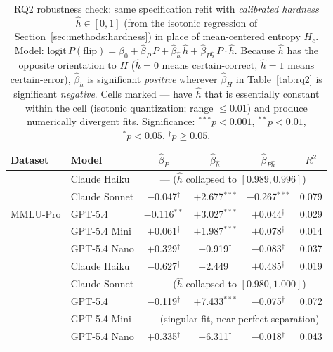 \begin{table}[t]
\centering
\caption{RQ2 robustness check: same specification refit with
  \emph{calibrated hardness} $\hat h \in [0, 1]$ (from the isotonic
  regression of Section~\ref{sec:methods:hardness}) in place of
  mean-centered entropy $H_c$. Model:
  $\mathrm{logit}\,P(\mathrm{flip}) = \beta_0 + \hat\beta_P\,P +
   \hat\beta_{\hat h}\,\hat h + \hat\beta_{P\hat h}\,P\!\cdot\!\hat h$.
  Because $\hat h$ has the opposite orientation to $H$
  ($\hat h{=}0$ means certain-correct, $\hat h{=}1$ means
  certain-error), $\hat\beta_{\hat h}$ is significant \emph{positive}
  wherever $\hat\beta_H$ in Table~\ref{tab:rq2} is significant
  \emph{negative}. Cells marked --- have $\hat h$ that is essentially
  constant within the cell (isotonic quantization; range $\leq 0.01$)
  and produce numerically divergent fits.
  Significance: $^{***}p{<}0.001$, $^{**}p{<}0.01$, $^{*}p{<}0.05$,
  $^\dagger p{\geq}0.05$.}
\label{tab:rq2_hardness}
\small\setlength{\tabcolsep}{3pt}
\begin{tabular}{ll cccc}
\toprule
\textbf{Dataset} & \textbf{Model} & $\hat\beta_P$ & $\hat\beta_{\hat h}$ & $\hat\beta_{P\hat h}$ & $R^2$ \\
\midrule
\multirow{5}{*}{MMLU-Pro}
  & Claude Haiku  & \multicolumn{4}{c}{--- \tiny{($\hat h$ collapsed to $[0.989, 0.996]$)}} \\
  & Claude Sonnet & $-$0.047$^\dagger$  & $+$2.677$^{***}$ & $-$0.267$^{***}$    & 0.079 \\
  & GPT-5.4       & $-$0.116$^{**}$     & $+$3.027$^{***}$ & $+$0.044$^\dagger$  & 0.029 \\
  & GPT-5.4 Mini  & $+$0.061$^\dagger$  & $+$1.987$^{***}$ & $+$0.078$^\dagger$  & 0.014 \\
  & GPT-5.4 Nano  & $+$0.329$^\dagger$  & $+$0.919$^\dagger$ & $-$0.083$^\dagger$ & 0.037 \\
\addlinespace
\multirow{5}{*}{GPQA-Diam.}
  & Claude Haiku  & $-$0.627$^\dagger$  & $-$2.449$^\dagger$ & $+$0.485$^\dagger$  & 0.019 \\
  & Claude Sonnet & \multicolumn{4}{c}{--- \tiny{($\hat h$ collapsed to $[0.980, 1.000]$)}} \\
  & GPT-5.4       & $-$0.119$^\dagger$  & $+$7.433$^{***}$ & $-$0.075$^\dagger$  & 0.072 \\
  & GPT-5.4 Mini  & \multicolumn{4}{c}{--- \tiny{(singular fit, near-perfect separation)}} \\
  & GPT-5.4 Nano  & $+$0.335$^\dagger$  & $+$6.311$^\dagger$ & $-$0.018$^\dagger$  & 0.043 \\
\bottomrule
\end{tabular}
\end{table}
